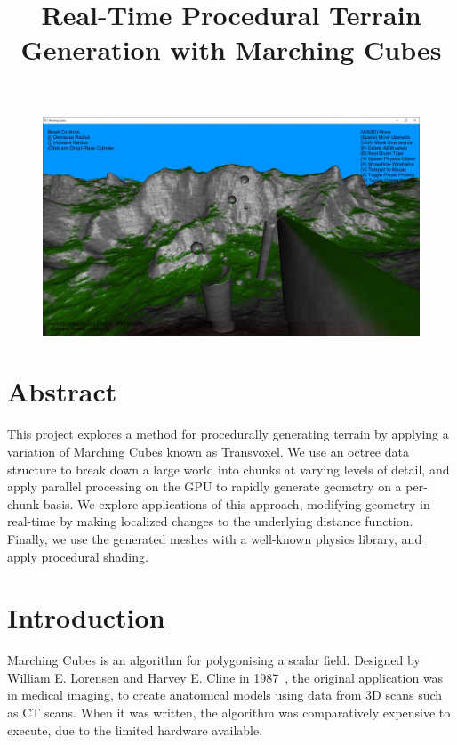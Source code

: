 \documentclass[11pt]{article}
\title{Real-Time Procedural Terrain Generation with Marching Cubes}
\author{}
\date{}
\begin{document}
% 


\maketitle
\begin{figure}[H]
  \includegraphics[width=\textwidth]{shaded_mountains.jpg}
\end{figure}
\newpage

\section*{Abstract} 
This project explores a method for procedurally generating terrain by applying a variation of Marching Cubes known as Transvoxel. We use an octree data structure to break down a large world into chunks at varying levels of detail, and apply parallel processing on the GPU to rapidly generate geometry on a per-chunk basis. We explore applications of this approach, modifying geometry in real-time by making localized changes to the underlying distance function. Finally, we use the generated meshes with a well-known physics library, and apply procedural shading.
\newpage

\tableofcontents

\newpage
\section{Introduction} 

Marching Cubes is an algorithm for polygonising a scalar field. Designed by William E. Lorensen and Harvey E. Cline in 1987~\cite{10.1145/37402.37422}, the original application was in medical imaging, to create anatomical models using data from 3D scans such as CT scans. When it was written, the algorithm was comparatively expensive to execute, due to the limited hardware available. 
\end{document}
